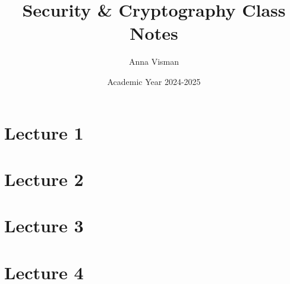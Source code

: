 \documentclass[10pt, oneside]{article}
\title{Security \& Cryptography Class Notes}
\author{Anna Visman}
\date{Academic Year 2024-2025}
\begin{document}
\maketitle
\tableofcontents

\vspace{.25in}

\section{Lecture 1}



\newpage

\section{Lecture 2}



\newpage

\section{Lecture 3}



\newpage

\section{Lecture 4}


\end{document}
